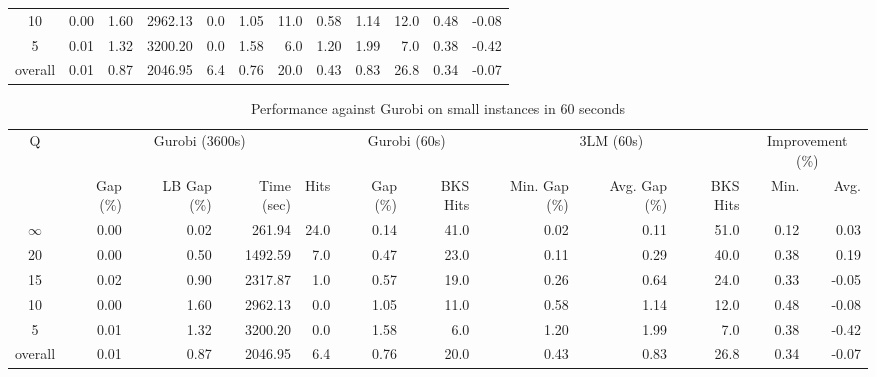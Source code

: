 \begin{table}[H]
\begin{tabular}{c rrrr rr rrr rr}
      10 &           0.00 &        1.60 &    2962.13 &  0.0 &         1.05 &     11.0 &          0.58 &          1.14 &     12.0 &             0.48 & -0.08 \\
       5 &           0.01 &        1.32 &    3200.20 &  0.0 &         1.58 &      6.0 &          1.20 &          1.99 &      7.0 &             0.38 & -0.42 \\
\midrule
 overall &           0.01 &        0.87 &    2046.95 &  6.4 &         0.76 &     20.0 &          0.43 &          0.83 &     26.8 &             0.34 & -0.07 \\
\bottomrule
\end{tabular}
\end{table}\begin{table}[H]
\centering
\caption{Performance against Gurobi on small instances in 60 seconds}
\label{tab:3lm_resuts100T60}
\begin{tabular}{c rrrr rr rrr rr}
\toprule
       Q & \multicolumn{4}{c}{Gurobi (3600s)} & \multicolumn{2}{c}{Gurobi (60s)} & \multicolumn{3}{c}{3LM (60s)} & \multicolumn{2}{c}{Improvement (\%)} \\
         &       Gap (\%) & LB Gap (\%) & Time (sec) & Hits &     Gap (\%) & BKS Hits & Min. Gap (\%) & Avg. Gap (\%) & BKS Hits &             Min. &  Avg. \\
\cmidrule(lr){1-1} \cmidrule(lr){2-5} \cmidrule(lr){2-5} \cmidrule(lr){6-7} \cmidrule(lr){8-10} \cmidrule(lr){11-12}
$\infty$ &           0.00 &        0.02 &     261.94 & 24.0 &         0.14 &     41.0 &          0.02 &          0.11 &     51.0 &             0.12 &  0.03 \\
      20 &           0.00 &        0.50 &    1492.59 &  7.0 &         0.47 &     23.0 &          0.11 &          0.29 &     40.0 &             0.38 &  0.19 \\
      15 &           0.02 &        0.90 &    2317.87 &  1.0 &         0.57 &     19.0 &          0.26 &          0.64 &     24.0 &             0.33 & -0.05 \\
      10 &           0.00 &        1.60 &    2962.13 &  0.0 &         1.05 &     11.0 &          0.58 &          1.14 &     12.0 &             0.48 & -0.08 \\
       5 &           0.01 &        1.32 &    3200.20 &  0.0 &         1.58 &      6.0 &          1.20 &          1.99 &      7.0 &             0.38 & -0.42 \\
\midrule
 overall &           0.01 &        0.87 &    2046.95 &  6.4 &         0.76 &     20.0 &          0.43 &          0.83 &     26.8 &             0.34 & -0.07 \\
\bottomrule
\end{tabular}
\end{table}
